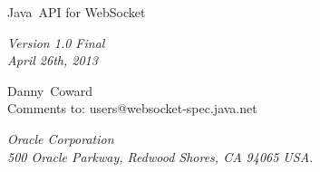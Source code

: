 \begin{titlepage}
\raggedleft

\vspace*{60pt}

{\Huge
\textsf{Java\texttrademark\ API for WebSocket
\vspace{10pt}}}

\vspace{20pt}

{
\Large\textit{Version 1.0 Final \\
April 26th, 2013}
}

\vspace{40pt}

{\large Danny\ Coward\\
\vspace{10pt}Comments to: users@websocket-spec.java.net
}

\vspace{80pt}

{\small\textit{Oracle Corporation\\
500 Oracle Parkway, Redwood Shores, CA 94065 USA.}
}
\end{titlepage} 
